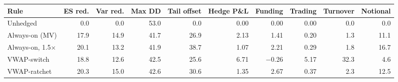 \begin{tabular}{@{}lrrrrrrrrr@{}}
\toprule
Rule & ES red. & Var red. & Max DD & Tail offset & Hedge P\&L & Funding & Trading & Turnover & Notional \\
\midrule
Unhedged & 0.0 & 0.0 & 53.0 & 0.0 & 0.00 & 0.00 & 0.00 & 0.0 & 0.0 \\
Always-on (MV) & 17.9 & 14.9 & 41.7 & 26.9 & 2.13 & 1.41 & 0.20 & 1.3 & 11.1 \\
Always-on, 1.5$\times$ & 20.1 & 13.2 & 41.9 & 38.7 & 1.07 & 2.21 & 0.29 & 1.8 & 16.7 \\
VWAP-switch & 18.8 & 12.6 & 42.5 & 25.6 & 6.71 & \ensuremath{-}0.26 & 5.17 & 32.3 & 4.6 \\
VWAP-ratchet & 20.3 & 15.0 & 42.6 & 30.6 & 1.35 & 2.67 & 0.37 & 2.3 & 12.5 \\
\bottomrule
\end{tabular}
